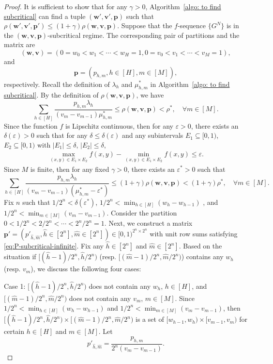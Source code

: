 \documentclass[11pt, reqno]{article}
\numberwithin{equation}{section}
\numberwithin{theorem}{section}
\begin{document}
\begin{proof}
It is sufficient to show that for any $\gamma>0$, Algorithm~\ref{algo: to find subcritical} can find a tuple $(\mathbf{w}',\mathbf{v}',\mathbf{p})$ such that $\rho(\mathbf{w}',\mathbf{v}',\mathbf{p}')\le (1+\gamma)\rho(\mathbf{w},\mathbf{v},\mathbf{p})$. 
Suppose that the $f$-sequence $\{G^N\}$ is in the $(\mathbf{w},\mathbf{v},\mathbf{p})$-subcritical regime. The corresponding pair of partitions and the matrix are
$$(\mathbf{w},\mathbf{v})=(0=w_0<w_1<\cdots<w_H=1,0=v_0<v_1<\cdots<v_M=1),$$
and $$\mathbf{p}=(p_{h,m},h\in[H],m\in[M]),$$
respectively.
Recall the definition of $\lambda_h$ and $\mu^*_{h,m}$ in Algorithm~\ref{algo: to find subcritical}.
By the definition of $\rho(\mathbf{w},\mathbf{v},\mathbf{p})$, we have 
$$\sum_{h\in[H]}\frac{p_{h,m}\lambda_h}{(v_m-v_{m-1})\mu^*_{h,m}}\le \rho(\mathbf{w},\mathbf{v},\mathbf{p})<\rho^*,\quad \forall m\in[M].$$
Since the function $f$ is Lipschitz continuous, then for any $\varepsilon>0$, there exists an $\delta(\varepsilon)>0$ such that for any $\delta\leq \delta(\varepsilon)$ and any subintervals $E_1\subseteq[0,1)$, $E_2\subseteq[0,1)$ with $|E_1|\leq \delta$, $|E_2|\leq \delta$,
\begin{align}
    \max_{(x,y)\in E_1\times E_2}f(x,y)-\min_{(x,y)\in E_1\times E_2}f(x,y)\leq \varepsilon.
\end{align}
Since $M$ is finite, then for any fixed $\gamma>0$, there exists an $\varepsilon^*>0$ such that 
$$\sum_{h\in[H]}\frac{p_{h,m}\lambda_h}{(v_m-v_{m-1})(\mu^*_{h,m}-\varepsilon^*)}\leq (1+\gamma)\rho(\mathbf{w},\mathbf{v},\mathbf{p})< (1+\gamma)\rho^*,\quad \forall m\in[M].$$
Fix $n$ such that $1/2^n < \delta(\varepsilon^*)$, $1/2^n < \min_{h\in[H]} (w_h-w_{h-1})$ , and $1/2^n < \min_{m\in[M]} (v_m-v_{m-1})$. 
Consider the partition $0<1/2^n<2/2^n<\cdots<2^n/2^n=1$. Next, we construct a matrix $\mathbf{p}'=(p'_{\hat{h},\hat{m}},\hat{h}\in[2^n],\hat{m}\in[2^n])\in[0,1)^{2^n\times 2^n}$ with unit row sums satisfying \eqref{eq:P-subcritical-infinite}. Fix any $\hat{h}\in[2^n]$ and $\hat{m}\in[2^n]$. Based on the situation if $ [(\hat{h}-1)/2^n,\hat{h}/2^n)$ (resp. $ [(\hat{m}-1)/2^n,\hat{m}/2^n)$) contains any $ w_h$ (resp. $ v_m$),  we discuss the following four cases:

Case 1: $[(\hat{h}-1)/2^n,\hat{h}/2^n)$ does not contain any $w_h$, $h\in[H]$, and $[(\hat{m}-1)/2^n,\hat{m}/2^n)$ does not contain any $v_m$, $m\in[M]$. Since $1/2^n < \min_{h\in[H]} (w_h-w_{h-1})$ and $1/2^n<\min_{m\in[M]} (v_m-v_{m-1})$, then $[(\hat{h}-1)/2^n,\hat{h}/2^n)\times [(\hat{m}-1)/2^n,\hat{m}/2^n)$ is a set of $[w_{h-1},w_h)\times [v_{m-1},v_m)$ for certain $h\in[H]$ and $m\in[M]$. Let $$p'_{\hat{h},\hat{m}}=\frac{p_{h,m}}{2^n(v_m-v_{m-1})}.$$


\end{proof}
\end{document}
